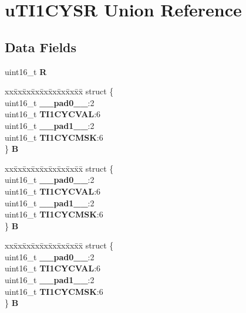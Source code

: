 \hypertarget{unionuTI1CYSR}{}\section{u\+T\+I1\+C\+Y\+SR Union Reference}
\label{unionuTI1CYSR}
\subsection*{Data Fields}
\begin{DoxyCompactItemize}
\item 
\mbox{\label{unionuTI1CYSR_a2e5d5b7d43961b42093e1c57056c0ed3}} 
uint16\+\_\+t {\bfseries R}
\item 
\mbox{\label{unionuTI1CYSR_aaa1992bf7dcf035971fa0bb1fae8ee86}} 
\begin{tabbing}
xx\=xx\=xx\=xx\=xx\=xx\=xx\=xx\=xx\=\kill
struct \{\\
\>uint16\_t {\bfseries \_\_pad0\_\_}:2\\
\>uint16\_t {\bfseries TI1CYCVAL}:6\\
\>uint16\_t {\bfseries \_\_pad1\_\_}:2\\
\>uint16\_t {\bfseries TI1CYCMSK}:6\\
\} {\bfseries B}\\

\end{tabbing}\item 
\mbox{\label{unionuTI1CYSR_a6ab063626b66ce007cc8fefbb1872693}} 
\begin{tabbing}
xx\=xx\=xx\=xx\=xx\=xx\=xx\=xx\=xx\=\kill
struct \{\\
\>uint16\_t {\bfseries \_\_pad0\_\_}:2\\
\>uint16\_t {\bfseries TI1CYCVAL}:6\\
\>uint16\_t {\bfseries \_\_pad1\_\_}:2\\
\>uint16\_t {\bfseries TI1CYCMSK}:6\\
\} {\bfseries B}\\

\end{tabbing}\item 
\mbox{\label{unionuTI1CYSR_a56725a5b11bd66e59e4da97453472ec4}} 
\begin{tabbing}
xx\=xx\=xx\=xx\=xx\=xx\=xx\=xx\=xx\=\kill
struct \{\\
\>uint16\_t {\bfseries \_\_pad0\_\_}:2\\
\>uint16\_t {\bfseries TI1CYCVAL}:6\\
\>uint16\_t {\bfseries \_\_pad1\_\_}:2\\
\>uint16\_t {\bfseries TI1CYCMSK}:6\\
\} {\bfseries B}\\


\end{tabbing}
\end{DoxyCompactItemize}
